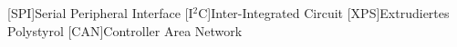 
\begin{acronym}[ACRONYM]
[SPI]{Serial Peripheral Interface}
[I$^2$C]{Inter-Integrated Circuit}
[XPS]{Extrudiertes Polystyrol}
[CAN]{Controller Area Network}
\end{acronym}\newpage

